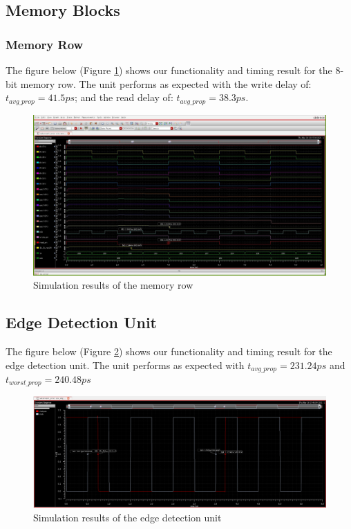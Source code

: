 \documentclass[letterpaper, 11pt]{article}
\begin{document}
	\newpage
	
	\subsection{Memory Blocks}
	\label{subsec:mem}
	
	\subsubsection{Memory Row}
	
	The figure below (Figure \ref{fig36}) shows our functionality and timing result for the 8-bit memory row. The unit performs as expected with the write delay of: $t_{avg\_prop} = 41.5ps$; and the read delay of: $t_{avg\_prop} = 38.3ps$.
	
	\begin{figure}[htb!]
		\centering
		\includegraphics[width=0.85\linewidth]{report_pics/mem_row_sim.jpg}
		\caption{Simulation results of the memory row}
		\label{fig36}
	\end{figure}
	
	\subsection{Edge Detection Unit}
	\label{subsec:edge_detect}
	
	The figure below (Figure \ref{fig37}) shows our functionality and timing result for the edge detection unit. The unit performs as expected with $t_{avg\_prop} = 231.24ps$ and $t_{worst\_prop} = 240.48ps$ 
	
	\begin{figure}[htb!]
		\centering
		\includegraphics[width=0.85\linewidth]{report_pics/edge_detect_sim.png}
		\caption{Simulation results of the edge detection unit}
		\label{fig37}
	\end{figure}
	
\end{document}
